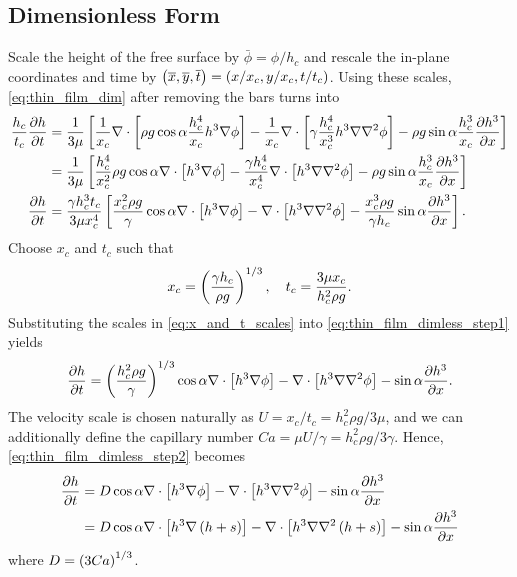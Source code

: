 \subsection{Dimensionless Form}
Scale the height of the free surface by $\bar{\phi} = \phi / h_c$ and rescale the in-plane coordinates and time by 
$\left( \overline{x}, \overline{y}, \overline{t} \right) = \left( x/x_c, y/x_c, t/t_c \right)$. Using these scales, \cref{eq:thin_film_dim} after removing the bars turns into 
\begin{align}
    \nonumber \frac{h_c}{t_c} \frac{\partial h}{\partial t} &= \frac{1}{3\mu} \left[  \frac{1}{x_c} \nabla \cdot \left[  \rho g \cos\alpha \frac{h_c^4}{x_c} h^3 \nabla \phi  \right] - \frac{1}{x_c} \nabla \cdot \left[  \gamma \frac{h_c^4}{x_c^3}h^3 \nabla\nabla^2\phi  \right] - \rho g \sin\alpha \frac{h_c^3}{x_c} \frac{\partial h^3}{\partial x}  \right]\\
    \nonumber &= \frac{1}{3\mu} \left[  \frac{h_c^4}{x_c^2}\rho g \cos\alpha \nabla \cdot \left[  h^3 \nabla \phi  \right] - \frac{\gamma h_c^4}{x_c^4} \nabla \cdot \left[ h^3 \nabla\nabla^2\phi  \right] - \rho g \sin\alpha \frac{h_c^3}{x_c} \frac{\partial h^3}{\partial x}  \right]\\
    \frac{\partial h}{\partial t} &= \frac{\gamma h_c^3 t_c}{3\mu x_c^4}\left[  \frac{x_c^2 \rho g}{\gamma} \cos\alpha \nabla \cdot \left[  h^3 \nabla \phi  \right] - \nabla \cdot \left[ h^3 \nabla\nabla^2\phi  \right] - \frac{x_c^3\rho g}{\gamma h_c} \sin\alpha \frac{\partial h^3}{\partial x}  \right].
    \label{eq:thin_film_dimless_step1}
\end{align}
Choose $x_c$ and $t_c$ such that
\begin{align}
    x_c = \left( \frac{\gamma h_c}{\rho g} \right)^{1/3}, \quad t_c = \frac{3\mu x_c}{h_c^2 \rho g}.
    \label{eq:x_and_t_scales}
\end{align} 
Substituting the scales in \cref{eq:x_and_t_scales} into \cref{eq:thin_film_dimless_step1} yields
\begin{align}
    \frac{\partial h}{\partial t} = \left( \frac{h_c^2 \rho g}{\gamma} \right)^{1/3} \cos\alpha \nabla \cdot \left[  h^3 \nabla \phi  \right] - \nabla \cdot \left[ h^3 \nabla\nabla^2\phi  \right] - \sin\alpha \frac{\partial h^3}{\partial x}. 
    \label{eq:thin_film_dimless_step2}
\end{align} 
The velocity scale is chosen naturally as $U = x_c/t_c = h_c^2\rho g/3\mu$,
and we can additionally define the capillary number $Ca = \mu U / \gamma = h_c^2\rho g/3\gamma$. 
Hence, \cref{eq:thin_film_dimless_step2} becomes 
\begin{align}
    \nonumber \frac{\partial h}{\partial t} &= D\cos\alpha \nabla \cdot \left[ h^3\nabla\phi \right] - \nabla \cdot \left[ h^3\nabla\nabla^2\phi \right] - \sin\alpha \frac{\partial h^3}{\partial x}\\
    &= D\cos\alpha \nabla \cdot \left[ h^3\nabla\left( h+s \right) \right] - \nabla \cdot \left[ h^3\nabla\nabla^2\left( h+s \right) \right] - \sin\alpha \frac{\partial h^3}{\partial x}
    \label{eq:thin_film_dimless}
\end{align}
where $D = \left( 3Ca \right)^{1/3}$. 


